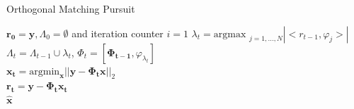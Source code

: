 \documentclass[xcolor=dvipsnames,10pt]{beamer}
\begin{document}
\begin{frame}{Orthogonal Matching Pursuit}
\begin{algorithm}[H]
\caption{Orthogonal Matching Pursuit}  
\begin{algorithmic}
\REQUIRE $\boldsymbol{r_0} = \boldsymbol{y}, \Lambda_0 = \emptyset$ and iteration counter $i = 1$
 \STATE  $\lambda_t = \text{argmax }_{j=1,\hdots,N}|<r_{t-1}, \varphi_j>|$ \\  
 \STATE  $\Lambda_t = \Lambda_{t-1} \cup {\lambda_t}$, $\Phi_t = [\boldsymbol{\Phi_{t-1}}, \varphi_{\lambda_t}]$ \\ 
\STATE   $\boldsymbol{x_t} = \text{argmin}_{\boldsymbol{x}} || \boldsymbol{y} - \boldsymbol{\Phi_t} \boldsymbol{x}||_2$  \\ 
\STATE  $\boldsymbol{r_t} =  \boldsymbol{y} - \boldsymbol{\Phi_t} \boldsymbol{x_t}$ \\ 
\ENDFOR
\RETURN  $\boldsymbol{\hat{x}}$
\end{algorithmic}
\end{algorithm}


\end{frame}
\end{document}
